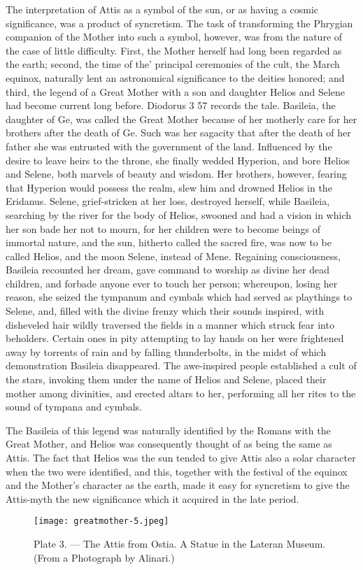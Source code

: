 \documentclass[a4paper, 11pt, oneside, polutonikogreek, english]{article}
\begin{document}
The interpretation of Attis as a symbol of the sun, or as having a cosmic significance, was a product of syncretism. The task of transforming the Phrygian companion of the Mother into such a symbol, however, was from the nature of the case of little difficulty. First, the Mother herself had long been regarded as the earth; second, the time of the' principal ceremonies of the cult, the March equinox, naturally lent an astronomical significance to the deities honored; and third, the legend of a Great Mother with a son and daughter Helios and Selene had become current long before. Diodorus 3 57 records the tale. Basileia, the daughter of Ge, was called the Great Mother because of her motherly care for her brothers after the death of Ge. Such was her sagacity that after the death of her father she was entrusted with the government of the land. Influenced by the desire to leave heirs to the throne, she finally wedded Hyperion, and bore Helios and Selene, both marvels of beauty and wisdom. Her brothers, however, fearing that Hyperion would possess the realm, slew him and drowned Helios in the Eridanus. Selene, grief-stricken at her loss, destroyed herself, while Basileia, searching by the river for the body of Helios, swooned and had a vision in which her son bade her not to mourn, for her children were to become beings of immortal nature, and the sun, hitherto called the sacred fire, was now to be called Helios, and the moon Selene, instead of Mene. Regaining consciousness, Basileia recounted her dream, gave command to worship as divine her dead children, and forbade anyone ever to touch her person; whereupon, losing her reason, she seized the tympanum and cymbals which had served as playthings to Selene, and, filled with the divine frenzy which their sounds inspired, with disheveled hair wildly traversed the fields in a manner which struck fear into beholders. Certain ones in pity attempting to lay hands on her were frightened away by torrents of rain and by falling thunderbolts, in the midst of which demonstration Basileia disappeared. The awe-inspired people established a cult of the stars, invoking them under the name of Helios and Selene, placed their mother among divinities, and erected altars to her, performing all her rites to the sound of tympana and cymbals.

The Basileia of this legend was naturally identified by the Romans with the Great Mother, and Helios was consequently thought of as being the same as Attis. The fact that Helios was the sun tended to give Attis also a solar character when the two were identified, and this, together with the festival of the equinox and the Mother's character as the earth, made it easy for syncretism to give the Attis-myth the new significance which it acquired in the late period.
\clearpage
\begin{landscape}
\begin{figure}[H]
\centering
\texttt{[image: greatmother-5.jpeg]}
\caption{Plate 3. --- The Attis from Ostia. A Statue in the Lateran Museum. (From a Photograph by Alinari.)}
\end{figure}
\end{landscape}
\clearpage
\end{document}
